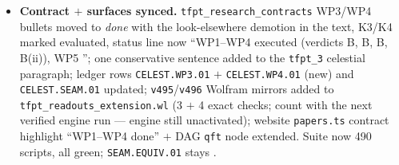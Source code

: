 \begin{itemize}[leftmargin=1.5em]
cumulative count $31s^2{+}92s{+}60$, $31=k{+}h^\vee$; $f_n/\chi_n$ strictly increasing $n=1..12$); (c)
the level-2 null ideal deletes exactly $27000=30^3=(h^\vee)^3$ out of
$\mathrm{Sym}^2(248)=1{+}3875{+}27000$ --- no jet analogue. \emph{But} the boundary/period reading holds
exactly at the current stratum (zero modes $=60=C_0$ currents, jet slice cycles $(60,64,60,64)$, one
$\mu_4$ period sums to 248, glue weights $(0,1,1,1)$ integer; free loop Fock $897266\gg248$, so the
truncation must come from a limit) --- the same MMST scaling-limit shape as \texttt{SEAM.EQUIV.01}
(\texttt{v336}/\texttt{v449}). K4 fires only against the exact-block reading; the constructive limit
question passes to WP5. Verdict B(ii).
\item \textbf{Contract $+$ surfaces synced.} \texttt{tfpt\_research\_contracts} WP3/WP4 bullets moved to
\emph{done} with the look-elsewhere demotion in the text, K3/K4 marked evaluated, status line now
``WP1--WP4 executed (verdicts B, B, B, B(ii)), WP5 \mO''; one conservative sentence added to the
\texttt{tfpt\_3} celestial paragraph; ledger rows \texttt{CELEST.WP3.01} $+$ \texttt{CELEST.WP4.01} (new)
and \texttt{CELEST.SEAM.01} updated; \texttt{v495}/\texttt{v496} Wolfram mirrors added to
\texttt{tfpt\_readouts\_extension.wl} (3 $+$ 4 exact checks; count with the next verified engine run ---
engine still unactivated); website \texttt{papers.ts} contract highlight ``WP1--WP4 done'' $+$ DAG
\texttt{qft} node extended. Suite now 490 scripts, all green; \texttt{SEAM.EQUIV.01} stays \mO.
\end{itemize}

